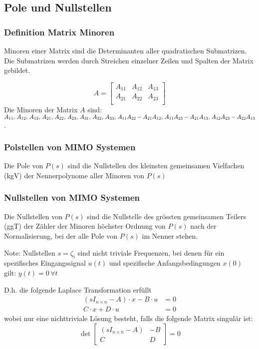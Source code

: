 \subsection{Pole und Nullstellen} 
\subsubsection{Definition Matrix Minoren}
        Minoren einer Matrix sind die Determinanten aller quadratischen Submatrizen. Die Submatrizen werden durch Streichen einzelner Zeilen und Spalten der Matrix gebildet.
        
        \begin{equation*}
            A = 
            \begin{bmatrix} 
                A_{11} & A_{12} & A_{13}\\
                A_{21} & A_{22} & A_{23}\\ 
            \end{bmatrix}
        \end{equation*}
        Die Minoren der Matrix $A$ sind:\\ $A_{11},\,A_{12},\,A_{13},\,A_{21},\,A_{22},\,A_{23},\,A_{31},\,A_{32},\,A_{33}, \\ \,A_{11}A_{22}-A_{21}A_{12},\,A_{11}A_{23}-A_{21}A_{13},\,A_{12}A_{23}-A_{22}A_{13}$.

    \subsubsection{Polstellen von MIMO Systemen}
        Die Pole von $P(s)$ sind die Nullstellen des kleinsten gemeinsamen Vielfachen (kgV) der Nennerpolynome aller Minoren von $P(s)$

    \subsubsection{Nullstellen von MIMO Systemen}
        Die Nullstellen von $P(s)$ sind die Nullstelle des grössten gemeinsamen Teilers (ggT) der Zähler der Minoren höchster Ordnung von $P(s)$ nach der Normalisierung, bei der alle Pole von $P(s)$ im Nenner stehen.
        
        Note: Nullstellen $s=\zeta_i$ sind nicht triviale Frequenzen, bei denen für ein spezifisches Eingangssignal $u(t)$ und spezifische Anfangsbedingungen $x(0)$ gilt: $y(t) = 0 \,\forall t$

        D.h. die folgende Laplace Transformation erfüllt
        \begin{align*}
            (sI_{n\times n} -A)\cdot x - B \cdot u &= 0\\
            C\cdot x + D \cdot u &= 0
        \end{align*}
        wobei nur eine nichttriviale Lösung besteht, falls die folgende Matrix singulär ist: 
        \begin{equation*}
            \det\begin{bmatrix}
                (sI_{n\times n}- A) & -B \\
                C& D
            \end{bmatrix} = 0
        \end{equation*}

